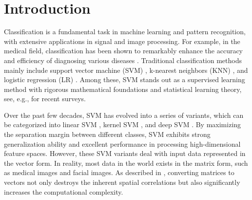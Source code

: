 \documentclass[sn-mathphys]{JORSC-jnl}%
\theoremstyle{thmstyleone}%
\theoremstyle{thmstylethree}%
\theoremstyle{thmstyleone} %
\begin{document}


\maketitle

\section{Introduction}\label{sec1}
Classification is a fundamental task in machine learning and pattern recognition, with extensive applications in signal and image processing. For example, in the medical field, classification has been shown to remarkably enhance the accuracy and efficiency of diagnosing various diseases \cite{yan2023reconfigurable}. Traditional classification methods mainly include support vector machine (SVM) \cite{cortes1995support}, k-nearest neighbors (KNN) \cite{cover1967nearest}, and logistic regression (LR) \cite{lavalley2008logistic}. Among these, SVM stands out as a supervised learning method with rigorous mathematical foundations and statistical learning theory, see, e.g., \cite{cervantes2020comprehensive,tanveer2024comprehensive} for recent surveys.

Over the past few decades, SVM has evolved into a series of variants, which can be categorized into linear SVM \cite{chen2026rml}, kernel SVM \cite{zhang2025stochastic}, and deep SVM \cite{okwuashi2020deep}.
By maximizing the separation margin between different classes, SVM exhibits strong generalization ability and excellent performance in processing high-dimensional feature spaces. 
However, these SVM variants deal with input data represented in the vector form. 
In reality, most data in the world exists in the matrix form, such as medical images and facial images.
As described in \cite{kumari2025support}, converting matrices to vectors not only destroys the inherent spatial correlations but also significantly increases the computational complexity.
\end{document}
